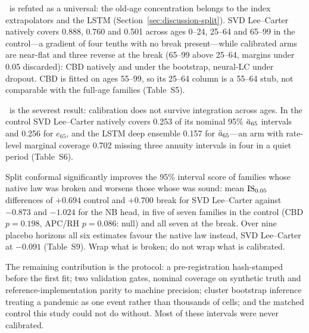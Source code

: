 \Hfour\ is refuted as a universal: the old-age concentration belongs to the
index extrapolators and the LSTM (Section~\ref{sec:discussion-split}). SVD
Lee--Carter natively covers 0.888, 0.760 and 0.501 across ages 0--24, 25--64
and 65--99 in the control---a gradient of four tenths with no break
present---while calibrated arms are near-flat and three reverse at the break
(65--99 above 25--64, margins under 0.05 discarded): CBD natively and under the
bootstrap, neural-LC under dropout. CBD is fitted on ages 55--99, so its 25--64
column is a 55--64 stub, not comparable with the full-age families (Table~S5).

\Hfive\ is the severest result: calibration does not survive integration across
ages. In the control SVD Lee--Carter natively covers 0.253 of its nominal 95\%
$\ddot{a}_{65}$ intervals and 0.256 for $e_{65}$, and the LSTM deep ensemble 0.157
for $\ddot{a}_{65}$---an arm with rate-level marginal coverage 0.702 missing three
annuity intervals in four in a quiet period (Table~S6).

Split conformal significantly improves the 95\% interval score of families
whose native law was broken and worsens those whose was sound: mean
$\operatorname{IS}_{0.05}$ differences of $+0.694$ control and $+0.700$ break for SVD
Lee--Carter against $-0.873$ and $-1.024$ for the NB head, in five of seven
families in the control (CBD $p=0.198$, APC/RH $p=0.086$: null) and all seven
at the break. Over nine placebo horizons all six estimates favour the native
law instead, SVD Lee--Carter at $-0.091$ (Table~S9). Wrap what is broken; do
not wrap what is calibrated.

The remaining contribution is the protocol: a pre-registration hash-stamped
before the first fit; two validation gates, nominal coverage on synthetic truth
and reference-implementation parity to machine precision; cluster bootstrap
inference treating a pandemic as one event rather than thousands of cells; and
the matched control this study could not do without. Most of these intervals were
never calibrated.
